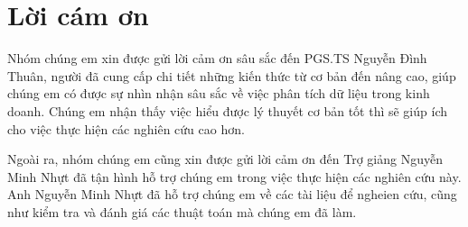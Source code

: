\section*{Lời cám ơn}
Nhóm chúng em xin được gửi lời cảm ơn sâu sắc đến PGS.TS Nguyễn Đình Thuân, người đã cung cấp chi tiết những kiến thức từ cơ bản đến nâng cao, giúp chúng em có được sự nhìn nhận sâu sắc về việc phân tích dữ liệu trong kinh doanh. Chúng em nhận thấy việc hiểu được lý thuyết cơ bản tốt thì sẽ giúp ích cho việc thực hiện các nghiên cứu cao hơn.

Ngoài ra, nhóm chúng em cũng xin được gửi lời cảm ơn đến Trợ giảng Nguyễn Minh Nhựt đã tận hình hỗ trợ chúng em trong việc thực hiện các nghiên cứu này. Anh Nguyễn Minh Nhựt đã hỗ trợ chúng em về các tài liệu để ngheien cứu, cũng như kiểm tra và đánh giá các thuật toán mà chúng em đã làm.
